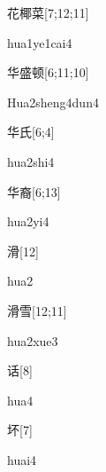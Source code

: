 \begin{verbete}{花椰菜}[7;12;11]
\begin{pronuncia}{hua1ye1cai4}
\end{pronuncia}
\end{verbete}

\begin{verbete}{华盛顿}[6;11;10]
\begin{pronuncia}[\\]{Hua2sheng4dun4}
\end{pronuncia}
\end{verbete}

\begin{verbete}{华氏}[6;4]
\begin{pronuncia}{hua2shi4}
\end{pronuncia}
\end{verbete}

\begin{verbete}[hua2yi4]{华裔}[6;13]
\begin{pronuncia}{hua2yi4}
\end{pronuncia}
\end{verbete}

\begin{verbete}[hua2]{滑}[12]
\begin{pronuncia}{hua2}
\end{pronuncia}
\end{verbete}

\begin{verbete}{滑雪}[12;11]
\begin{pronuncia}{hua2xue3}
\end{pronuncia}
\end{verbete}

\begin{verbete}[hua4]{话}[8]
\begin{pronuncia}{hua4}
\end{pronuncia}
\end{verbete}

\begin{verbete}[huai4]{坏}[7]
\begin{pronuncia}{huai4}
\end{pronuncia}
\end{verbete}

